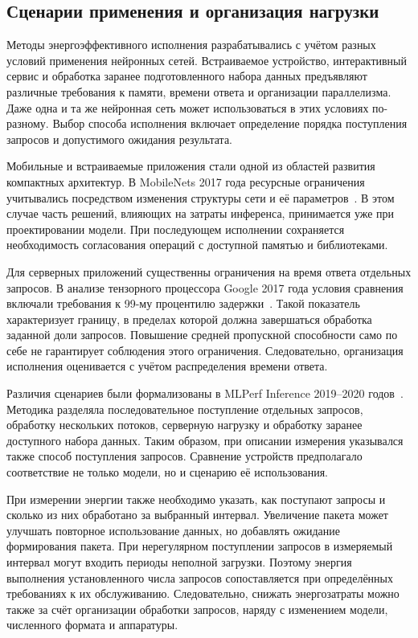 \subsection{Сценарии применения и организация нагрузки}

Методы энергоэффективного исполнения разрабатывались с учётом разных условий
применения нейронных сетей. Встраиваемое
устройство, интерактивный сервис и обработка заранее
подготовленного набора данных предъявляют различные требования
к памяти, времени ответа и организации параллелизма.
Даже одна и та же нейронная сеть может использоваться в этих условиях
по-разному.
Выбор способа исполнения включает определение порядка
поступления запросов и допустимого ожидания результата.

Мобильные и встраиваемые приложения стали одной из областей
развития компактных архитектур. В MobileNets 2017 года
ресурсные ограничения учитывались посредством изменения
структуры сети и её параметров~\cite{howard2017mobilenets}.
В этом случае часть решений, влияющих на затраты инференса, принимается уже
при проектировании модели.
При последующем исполнении сохраняется необходимость
согласования операций с доступной памятью и библиотеками.

Для серверных приложений существенны ограничения
на время ответа отдельных запросов. В анализе тензорного
процессора Google 2017 года условия сравнения включали
требования к 99-му процентилю задержки~\cite{jouppi2017}.
Такой показатель характеризует границу, в пределах которой
должна завершаться обработка заданной доли запросов.
Повышение средней пропускной способности само по себе не гарантирует
соблюдения этого ограничения. Следовательно, организация
исполнения оценивается с учётом распределения времени ответа.

Различия сценариев были формализованы в MLPerf Inference
2019--2020 годов~\cite{mlperf2020}. Методика разделяла
последовательное поступление отдельных запросов,
обработку нескольких потоков, серверную нагрузку
и обработку заранее доступного набора данных.
Таким образом, при описании измерения указывался также способ поступления
запросов. Сравнение устройств предполагало
соответствие не только модели, но и сценарию её использования.

При измерении энергии также необходимо указать, как поступают запросы и
сколько из них обработано за выбранный интервал. Увеличение пакета может улучшать
повторное использование данных, но добавлять ожидание
формирования пакета. При нерегулярном поступлении запросов
в измеряемый интервал могут входить периоды неполной загрузки.
Поэтому энергия выполнения установленного числа запросов
сопоставляется при определённых требованиях к их обслуживанию.
Следовательно, снижать энергозатраты можно также за счёт организации обработки
запросов, наряду с изменением модели, численного формата и аппаратуры.

